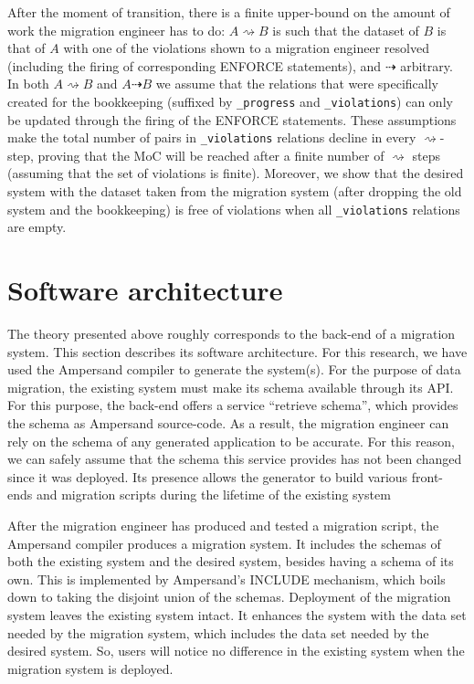 \documentclass{elsarticle}
\begin{document}
After the moment of transition, there is a finite upper-bound on the amount of work the migration engineer has to do:
   $A\rightsquigarrow B$ is such that the dataset of $B$ is that of $A$ with one of the violations shown to a migration engineer resolved (including the firing of corresponding ENFORCE statements), and $\dashrightarrow$ arbitrary.
   In both $A\rightsquigarrow B$ and $A\dashrightarrow B$ we assume that the relations that were specifically created for the bookkeeping (suffixed by \verb=_progress= and \verb=_violations=) can only be updated through the firing of the ENFORCE statements.
   These assumptions make the total number of pairs in \verb=_violations= relations decline in every $\rightsquigarrow$-step, proving that the MoC will be reached after a finite number of $\rightsquigarrow$ steps (assuming that the set of violations is finite).
   Moreover, we show that the desired system with the dataset taken from the migration system (after dropping the old system and the bookkeeping) is free of violations when all \verb=_violations= relations are empty.


\section{Software architecture}
   The theory presented above roughly corresponds to the back-end of a migration system.
   This section describes its software architecture.
   For this research, we have used the Ampersand compiler to generate the system(s).
   For the purpose of data migration, the existing system must make its schema available through its API.
   For this purpose, the back-end offers a service ``retrieve schema'', which provides the schema as Ampersand source-code.
   As a result, the migration engineer can rely on the schema of any generated application to be accurate.
   For this reason, we can safely assume that the schema this service provides has not been changed since it was deployed.
   Its presence allows the generator to build various front-ends and migration scripts during the lifetime of the existing system%

   After the migration engineer has produced and tested a migration script, the Ampersand compiler produces a migration system.
   It includes the schemas of both the existing system and the desired system, besides having a schema of its own.
   This is implemented by Ampersand's INCLUDE mechanism, which boils down to taking the disjoint union of the schemas.
   Deployment of the migration system leaves the existing system intact.
   It enhances the system with the data set needed by the migration system, which includes the data set needed by the desired system.
   So, users will notice no difference in the existing system when the migration system is deployed.
\end{document}

